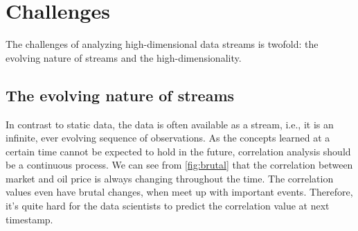 \section{Challenges}
\label{sec:Introduction:Challenges}
The challenges of analyzing high-dimensional data streams is twofold: the evolving nature of streams and the high-dimensionality.\\

\subsection{The evolving nature of streams}
\label{sec:Introduction:Challenges:Streams}
In contrast to static data, the data is often available as a stream, i.e., it is an infinite, ever evolving sequence of observations. As the concepts learned at a certain time cannot be expected to hold in the future, correlation analysis should be a continuous process. We can see from \autoref{fig:brutal} that the correlation between market and oil price is always changing throughout the time. The correlation values even have brutal changes, when meet up with important events. Therefore, it's quite hard for the data scientists to predict the correlation value at next timestamp.\\

